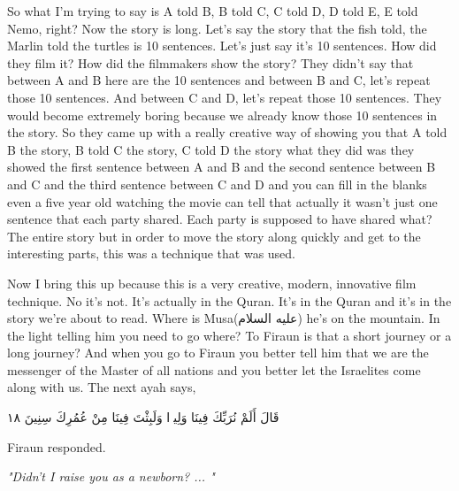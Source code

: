\documentclass[12pt]{article}
\newcommand{\as}{\textarabic{(عليه السلام)}}
\begin{document}
So what I'm trying to say is A told B, B told C, C told D, D told E, E told Nemo, right? Now the story is long. Let's say the story that the fish told, the Marlin told the turtles is 10 sentences. Let's just say it's 10 sentences. How did they film it? How did the filmmakers show the story? They didn't say that between A and B here are the 10 sentences and between B and C, let's repeat those 10 sentences. And between C and D, let's repeat those 10 sentences. They would become extremely boring because we already know those 10 sentences in the story. So they came up with a really creative way of showing you that A told B the story, B told C the story, C told D the story what they did was they showed the first sentence between A and B and the second sentence between B and C and the third sentence between C and D and you can fill in the blanks even a five year old watching the movie can tell that actually it wasn't just one sentence that each party shared. Each party is supposed to have shared what? The entire story but in order to move the story along quickly and get to the interesting parts, this was a technique that was used. 

Now I bring this up because this is a very creative, modern, innovative film technique. No it's not. It's actually in the Quran. It's in the Quran and it's in the story we're about to read. Where is Musa\as{} he's on the mountain. In the light telling him you need to go where? To Firaun is that a short journey or a long journey? And when you go to Firaun you better tell him that we are the messenger of the Master of all nations and you better let the Israelites come along with us. The next ayah says, 

\textarabic{قَالَ أَلَمْ نُرَبِّكَ فِينَا وَلِيدًۭا وَلَبِثْتَ فِينَا مِنْ عُمُرِكَ سِنِينَ ١٨}

Firaun responded. 

\textit{"Didn't I raise you as a newborn? ... "} 
\end{document}
